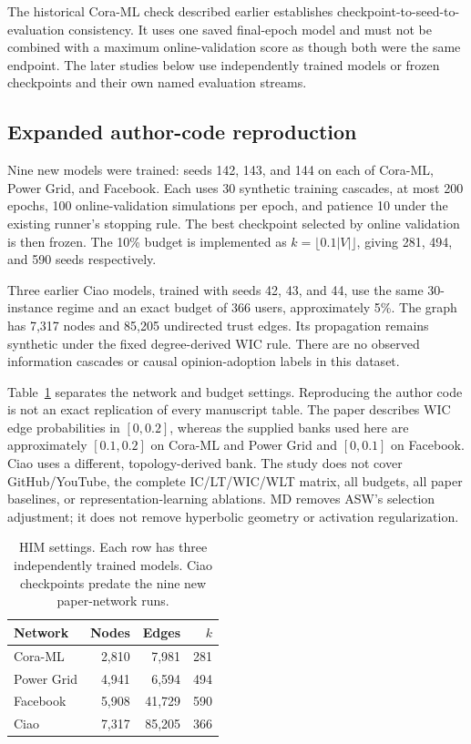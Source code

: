 The historical Cora-ML check described earlier establishes checkpoint-to-seed-to-evaluation consistency. It uses one saved final-epoch model and must not be combined with a maximum online-validation score as though both were the same endpoint. The later studies below use independently trained models or frozen checkpoints and their own named evaluation streams.

\subsection{Expanded author-code reproduction}
Nine new models were trained: seeds 142, 143, and 144 on each of Cora-ML, Power Grid, and Facebook. Each uses 30 synthetic training cascades, at most 200 epochs, 100 online-validation simulations per epoch, and patience 10 under the existing runner's stopping rule. The best checkpoint selected by online validation is then frozen. The 10\% budget is implemented as $k=\lfloor0.1|V|\rfloor$, giving 281, 494, and 590 seeds respectively.

Three earlier Ciao models, trained with seeds 42, 43, and 44, use the same 30-instance regime and an exact budget of 366 users, approximately 5\%. The graph has 7,317 nodes and 85,205 undirected trust edges. Its propagation remains synthetic under the fixed degree-derived WIC rule. There are no observed information cascades or causal opinion-adoption labels in this dataset.

Table~\ref{tab:him-scope} separates the network and budget settings. Reproducing the author code is not an exact replication of every manuscript table. The paper describes WIC edge probabilities in $[0,0.2]$, whereas the supplied banks used here are approximately $[0.1,0.2]$ on Cora-ML and Power Grid and $[0,0.1]$ on Facebook. Ciao uses a different, topology-derived bank. The study does not cover GitHub/YouTube, the complete IC/LT/WIC/WLT matrix, all budgets, all paper baselines, or representation-learning ablations. MD removes ASW's selection adjustment; it does not remove hyperbolic geometry or activation regularization.

\begin{table}[t]
\centering\footnotesize
\caption{HIM settings. Each row has three independently trained models. Ciao checkpoints predate the nine new paper-network runs.}
\label{tab:him-scope}
\setlength{\tabcolsep}{3.5pt}
\begin{tabular}{@{}lrrr@{}}
\toprule
Network & Nodes & Edges & $k$ \\
\midrule
Cora-ML & 2,810 & 7,981 & 281 \\
Power Grid & 4,941 & 6,594 & 494 \\
Facebook & 5,908 & 41,729 & 590 \\
Ciao & 7,317 & 85,205 & 366 \\
\bottomrule
\end{tabular}
\end{table}

